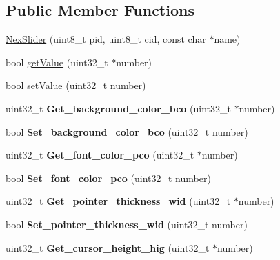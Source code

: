 \subsection*{Public Member Functions}
\begin{DoxyCompactItemize}
\item 
\hyperlink{class_nex_slider_a00c5678209c936e9a57c14b6e2384774}{Nex\+Slider} (uint8\+\_\+t pid, uint8\+\_\+t cid, const char $\ast$name)
\item 
bool \hyperlink{class_nex_slider_a384d5488b421efd6affbfd32f45bb107}{get\+Value} (uint32\+\_\+t $\ast$number)
\item 
bool \hyperlink{class_nex_slider_a3f325bda4db913e302e94a4b25de7b5f}{set\+Value} (uint32\+\_\+t number)
\item 
\hypertarget{class_nex_slider_a1cf49184702852c0623a695f4b62b1ed}{uint32\+\_\+t {\bfseries Get\+\_\+background\+\_\+color\+\_\+bco} (uint32\+\_\+t $\ast$number)}\label{class_nex_slider_a1cf49184702852c0623a695f4b62b1ed}

\item 
\hypertarget{class_nex_slider_ac22c66fecb8cf03d554c3c86e6e798d5}{bool {\bfseries Set\+\_\+background\+\_\+color\+\_\+bco} (uint32\+\_\+t number)}\label{class_nex_slider_ac22c66fecb8cf03d554c3c86e6e798d5}

\item 
\hypertarget{class_nex_slider_aa6361627b3c66ee7a569b5cfec4ce562}{uint32\+\_\+t {\bfseries Get\+\_\+font\+\_\+color\+\_\+pco} (uint32\+\_\+t $\ast$number)}\label{class_nex_slider_aa6361627b3c66ee7a569b5cfec4ce562}

\item 
\hypertarget{class_nex_slider_acc766d430c7a663846e4da6e1bacf76c}{bool {\bfseries Set\+\_\+font\+\_\+color\+\_\+pco} (uint32\+\_\+t number)}\label{class_nex_slider_acc766d430c7a663846e4da6e1bacf76c}

\item 
\hypertarget{class_nex_slider_a6adbc43b663e3542a92641c406db23ad}{uint32\+\_\+t {\bfseries Get\+\_\+pointer\+\_\+thickness\+\_\+wid} (uint32\+\_\+t $\ast$number)}\label{class_nex_slider_a6adbc43b663e3542a92641c406db23ad}

\item 
\hypertarget{class_nex_slider_a6b91c1f7fddf7ea1b62c406453110ead}{bool {\bfseries Set\+\_\+pointer\+\_\+thickness\+\_\+wid} (uint32\+\_\+t number)}\label{class_nex_slider_a6b91c1f7fddf7ea1b62c406453110ead}

\item 
\hypertarget{class_nex_slider_a680c31b1aa2dc48a1193c9d8fb3cd487}{uint32\+\_\+t {\bfseries Get\+\_\+cursor\+\_\+height\+\_\+hig} (uint32\+\_\+t $\ast$number)}\label{class_nex_slider_a680c31b1aa2dc48a1193c9d8fb3cd487}


\end{DoxyCompactItemize}
